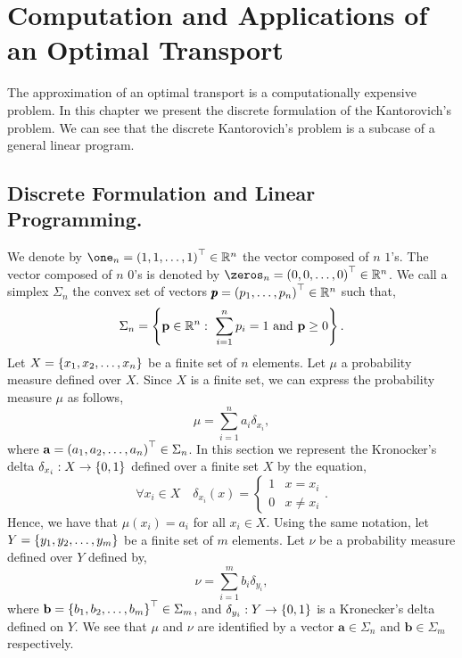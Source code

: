 \chapter{Computation and Applications of an Optimal Transport}
The approximation of an optimal transport is a computationally expensive problem.  In this chapter we present the discrete formulation of the Kantorovich's problem.  We can see that the discrete Kantorovich's problem is a subcase of a general linear program. 
\section{Discrete Formulation and Linear Programming.}
We denote by $\one_n=\parentheses{1,1,\dots,1}^\top\in \Real^n$ the vector composed of $n$ $1$'s. The vector composed of $n$ $0$'s is denoted by $\zeros_n=\parentheses{0,0,\dots, 0}^\top\in\Real^n$. We call a simplex $\Sigma_n$ the convex set of vectors $\pmb{p}=\left( p_1, \dots, p_n \right)^\top\in \mathbb{R}^n$ such that, 
\begin{equation}
	\Sigma_n=\braces{\mathbf{p} \in \Real^n: \ \sum_{i=1}^{n}{p_i}=1\ \mand\ \mathbf{p}\geq 0 }.
\end{equation}
Let $X=\left\lbrace x_1, x_2, \dots, x_n \right\rbrace$ be a finite set of $n$ elements. Let $\mu$ a probability measure defined over $X$. Since $X$ is a finite set, we can express the probability measure $\mu$ as follows,
\begin{equation}
	\mu=\sum_{i=1}^{n} a_i \delta_{x_i},
\end{equation}
where $\mathbf{a}=\left( a_1, a_2, \dots, a_n \right)^\top \in \Sigma_n$. In this section we represent the Kronocker's delta $\delta_{x_i}: X\to \left\lbrace 0,1 \right\rbrace$ defined over a finite set $X$ by the equation,
\begin{equation*}
\forall x_i\in X\quad	\delta_{x_i}(x)=\begin{cases}
	1 & x=x_i \\
	0 & x\neq x_i
	\end{cases}.
\end{equation*}  
Hence, we have that $\mu(x_i)=a_i$ for all $x_i\in X$. Using the same notation, let $Y=\left\lbrace y_1, y_2, \dots, y_m \right\rbrace$ be a finite set of $m$ elements. Let $\nu$ be a probability measure defined over $Y$ defined by,
\begin{equation}
	\nu=\sum_{i=1}^{m} b_i \delta_{y_i},
\end{equation}
where $\mathbf{b}=\left\lbrace b_1, b_2, \dots, b_m \right\rbrace^\top\in \Sigma_m$,  and $\delta_{y_i}: Y\to\left\lbrace 0,1 \right\rbrace$ is a Kronecker's delta defined on $Y$. We see that $\mu$ and $\nu$ are identified by a vector $\mathbf{a}\in \Sigma_n$ and $\mathbf{b}\in \Sigma_m$ respectively. 

